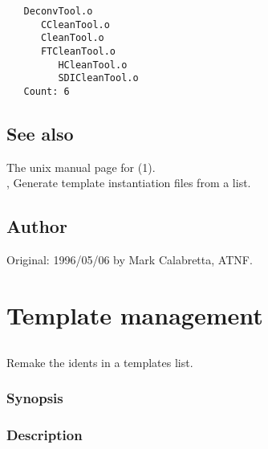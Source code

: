 \begin{verbatim}
   DeconvTool.o
      CCleanTool.o
      CleanTool.o
      FTCleanTool.o
         HCleanTool.o
         SDICleanTool.o
   Count: 6
\end{verbatim}

\subsection*{See also}

The unix manual page for (1).\\
, Generate template instantiation files from a list.

\subsection*{Author}

Original: 1996/05/06 by Mark Calabretta, ATNF.


\newpage
\section{Template management}
\label{templatemgmt}


\subsection{}
\label{reident}

Remake the idents in a templates list.

\subsubsection*{Synopsis}

\begin{synopsis}
\end{synopsis}

\subsubsection*{Description}

